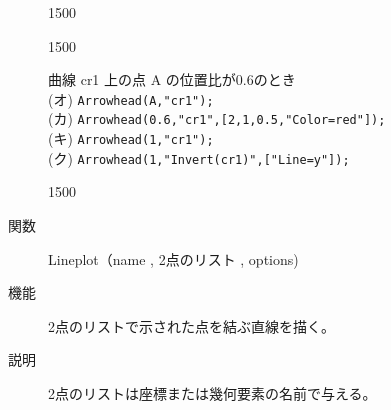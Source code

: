 \documentclass[papersize,a4paper,12pt,uplatex]{jsarticle}
\begin{document}
\begin{description}
\vspace{5mm}

\begin{layer}{150}{0}
\end{layer}

\vspace{35mm}

\vspace{0.5zw}

\begin{layer}{150}{0}
\end{layer}

曲線 cr1 上の点 A の位置比が0.6のとき\\
\hspace*{2.5zw}(オ) \verb|Arrowhead(A,"cr1");|\\
\hspace*{2.5zw}(カ) \verb|Arrowhead(0.6,"cr1",[2,1,0.5,"Color=red"]);|\\
\hspace*{2.5zw}(キ) \verb|Arrowhead(1,"cr1");|\\
\hspace*{2.5zw}(ク) \verb|Arrowhead(1,"Invert(cr1)",["Line=y"]);|

\vspace{5mm}

\begin{layer}{150}{0}
\end{layer}

\vspace{35mm}

\vspace{\baselineskip}
\hypertarget{lineplot}{}
\item[関数]Lineplot（name , 2点のリスト , options)
\item[機能]2点のリストで示された点を結ぶ直線を描く。
\item[説明]2点のリストは座標または幾何要素の名前で与える。


\end{description}
\end{document}

